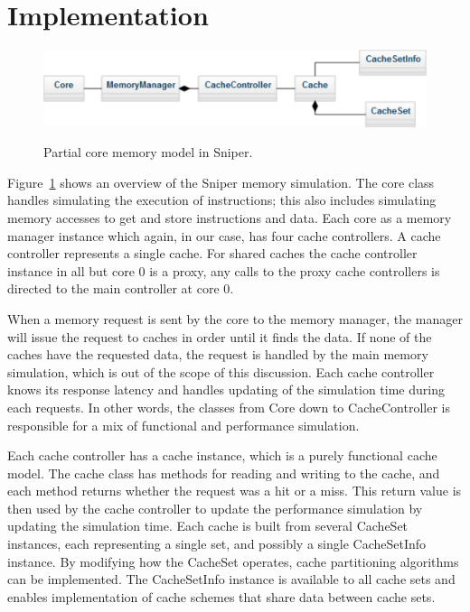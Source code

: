\section{Implementation}
\label{sec:framework:implementation}

\begin{figure}[ht]
\centering
\includegraphics[scale=0.7]{figures/framework/functional_core_model}
\label{fig:framework:implementation:core_memory}
\caption{Partial core memory model in Sniper.}
\end{figure}

Figure~\ref{fig:framework:implementation:core_memory} shows an overview of the Sniper memory simulation.
The core class handles simulating the execution of instructions; this also includes simulating memory accesses to get and store instructions and data.
Each core as a memory manager instance which again, in our case, has four cache controllers.
A cache controller represents a single cache.
For shared caches the cache controller instance in all but core 0 is a proxy, any calls to the proxy cache controllers is directed to the main controller at core 0.

When a memory request is sent by the core to the memory manager, the manager will issue the request to caches in order until it finds the data. 
If none of the caches have the requested data, the request is handled by the main memory simulation, which is out of the scope of this discussion.
Each cache controller knows its response latency and handles updating of the simulation time during each requests.
In other words, the classes from Core down to CacheController is responsible for a mix of functional and performance simulation.

Each cache controller has a cache instance, which is a purely functional cache model.
The cache class has methods for reading and writing to the cache, and each method returns whether the request was a hit or a miss.
This return value is then used by the cache controller to update the performance simulation by updating the simulation time.
Each cache is built from several CacheSet instances, each representing a single set, and possibly a single CacheSetInfo instance.
By modifying how the CacheSet operates, cache partitioning algorithms can be implemented.
The CacheSetInfo instance is available to all cache sets and enables implementation of cache schemes that share data between cache sets.

